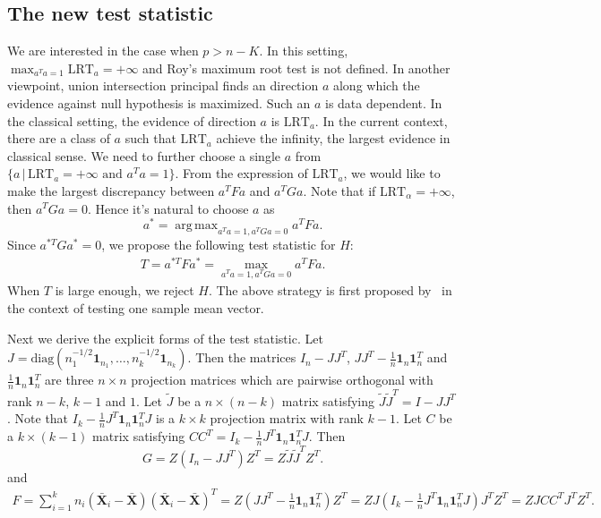 \documentclass[review]{elsarticle}
\DeclareMathOperator*{\argmax}{arg\,max}
\theoremstyle{plain}
\theoremstyle{definition}
\theoremstyle{remark}
\begin{document}
\subsection{The new test statistic}
We are interested in the case when $p> n-K$.
In this setting, $\max_{a^T a=1}\text{LRT}_a=+\infty$ and Roy's maximum root test is not defined. 
In another viewpoint, union intersection principal finds an direction $a$ along which the evidence against null hypothesis is maximized.
Such an $a$ is data dependent.
In the classical setting, the evidence of direction $a$ is $\text{LRT}_a$.
In the current context, there are a class of $a$ such that $\text{LRT}_a$ achieve the infinity, the largest evidence in classical sense.
We need to further choose a single $a$ from $\{a\,|\,\text{LRT}_a=+\infty\text{ and }a^T a =1\}$.
 From the expression of $\text{LRT}_a$, we would like to make the largest discrepancy between $a^T F a$ and $a^T G a$.
Note that if $\text{LRT}_{\alpha}=+\infty$, then $a^T G a=0$.
Hence it's natural to choose $a$ as
$$
        a^{*}=
        \argmax_{a^T a=1, a^T G a=0} 
        a^T F a.
$$
Since $a^{*T}G a^*=0$, we propose the following test statistic for $H$:
\begin{equation*}
    \begin{aligned}
        T=a^{*T} F a^*
        =
        \max_{a^T a=1, a^T G a=0} 
        a^T F a.
    \end{aligned}
\end{equation*}
When $T$ is large enough, we reject $H$.
The above strategy is first proposed by~\cite{Zhao2016A} in the context of testing one sample mean vector.


Next we derive the explicit forms of the test statistic. 
Let $J=\mathrm{diag}(n_1^{-1/2}\mathbf{1}_{n_1},\ldots,n_k^{-1/2}\mathbf{1}_{n_k})$.
Then the matrices $I_n-JJ^T$, $JJ^T-\frac{1}{n}\mathbf{1}_n\mathbf{1}_n^T$ and $\frac{1}{n}\mathbf{1}_n\mathbf{1}_n^T$ are three $n\times n$ projection matrices which are pairwise orthogonal with rank $n-k$, $k-1$ and $1$.
Let $\tilde{J}$ be a $n\times (n-k)$ matrix satisfying $\tilde{J}\tilde{J}^T =I-JJ^T$.
Note that $I_k-\frac{1}{n}J^T\mathbf{1}_n \mathbf{1}_n^T J$ is a $k\times k$ projection matrix with rank $k-1$.
Let $C$ be a $k\times (k-1)$ matrix satisfying $CC^T=I_k-\frac{1}{n}J^T\mathbf{1}_n \mathbf{1}_n^T J$.
Then 
$$
G=Z(I_n-JJ^T)Z^T=
Z\tilde{J}\tilde{J}^T Z^T.
$$
and
\begin{equation*}
    \begin{aligned}
        F=\sum_{i=1}^k n_i (\bar{\mathbf{X}}_i-\bar{\mathbf{X}})(\bar{\mathbf{X}}_i-\bar{\mathbf{X}})^T 
        =Z(JJ^T-\frac{1}{n}\mathbf{1}_n\mathbf{1}_n^T)Z^T
=ZJ(I_k-\frac{1}{n}J^T\mathbf{1}_n \mathbf{1}_n^T J)J^T Z^T
=ZJC C^T J^T Z^T.
    \end{aligned}
\end{equation*}
\end{document}
